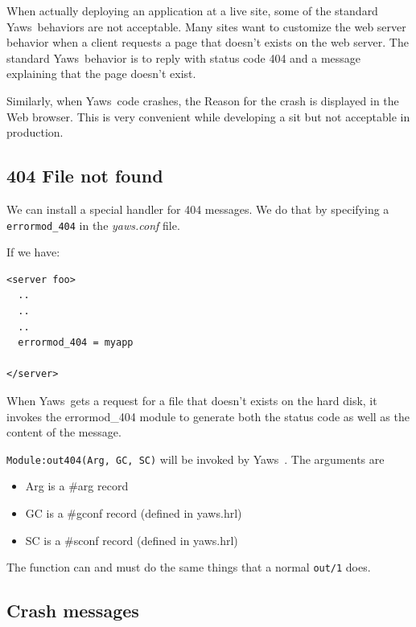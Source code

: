 \documentclass[11pt,oneside,english]{book}
\newcommand{\Yaws}            %
        {{\sc Yaws}}
\begin{document}
When actually deploying an application at a live site, some
of the standard \Yaws\  behaviors are not acceptable. Many sites
want to customize the web server behavior when a client requests
a page that doesn't exists on the web server. The standard \Yaws\
behavior
is to reply with status code 404 and a message explaining that the
page doesn't exist.

Similarly, when \Yaws\  code crashes, the Reason for the crash is
displayed in the Web browser. This is very convenient while
developing a sit but not acceptable in production.


  \subsection{404 File not found}

We can install a special handler for 404 messages. We do that by
specifying a \verb+errormod_404+ in the \textit{yaws.conf} file.

If we have:

\begin{verbatim}
<server foo>
  ..
  ..
  ..
  errormod_404 = myapp

</server>

\end{verbatim}

When \Yaws\  gets a request for  a file that doesn't exists
on the hard disk, it invokes the errormod\_404 module
to generate both the status code as well as the content of the
message.

        \verb+Module:out404(Arg, GC, SC)+ will
                   be invoked by \Yaws\ . The arguments are

\begin{itemize}
\item              Arg is a \#arg{} record

\item              GC  is  a  \#gconf{}   record   (defined   in
              yaws.hrl)

\item              SC   is   a   \#sconf{}  record  (defined  in
              yaws.hrl)
\end{itemize}

              The function can and must do the same things
              that a normal \verb+out/1+ does.




  \subsection{Crash messages}
\end{document}
